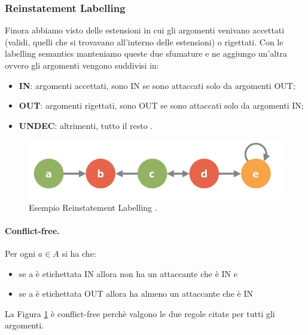 \subsubsection{Reinstatement Labelling}
Finora abbiamo visto delle estensioni in cui gli argomenti venivano accettati (validi, quelli che si trovavano all'interno delle estensioni) o rigettati. Con le labelling semantics manteniamo queste due sfumature e ne aggiungo un'altra ovvero gli argomenti vengono suddivisi in:
\begin{itemize}
    \item \textbf{IN}: argomenti accettati, sono IN se sono attaccati solo da argomenti OUT;
    \item \textbf{OUT}: argomenti rigettati, sono OUT se sono attaccati solo da argomenti IN;
    \item \textbf{UNDEC}: altrimenti, tutto il resto .
\end{itemize}
\begin{figure}[H]
    \centering
    \includegraphics[width=13cm, keepaspectratio]{img/labelling_semantics_es.png}
    \caption{Esempio Reinstatement Labelling .}\label{fig:es_Reinstatement_Labelling}
\end{figure}

\paragraph{Conflict-free.}
Per ogni $a \in A$ si ha che:
\begin{itemize}
    \item se a è etichettata IN allora non ha un attaccante che è IN e
    \item se a è etichettata OUT allora ha almeno un attaccante che è IN
\end{itemize}
La Figura \ref{fig:es_Reinstatement_Labelling} è conflict-free perchè valgono le due regole citate per tutti gli argomenti. 

